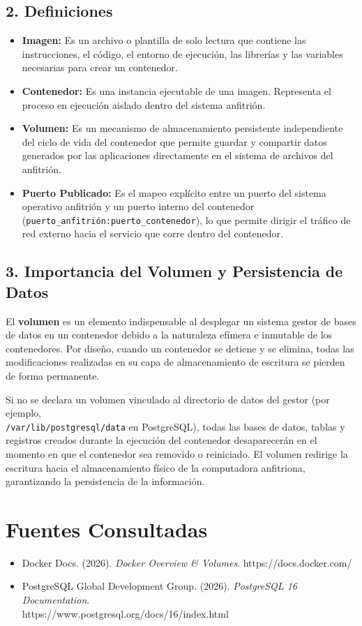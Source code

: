 \documentclass[12pt,letterpaper]{article}
\begin{document}
\subsection*{2. Definiciones}
\begin{itemize}
    \item \textbf{Imagen:} Es un archivo o plantilla de solo lectura que contiene las instrucciones, el código, el entorno de ejecución, las librerías y las variables necesarias para crear un contenedor.
    
    \item \textbf{Contenedor:} Es una instancia ejecutable de una imagen. Representa el proceso en ejecución aislado dentro del sistema anfitrión.
    
    \item \textbf{Volumen:} Es un mecanismo de almacenamiento persistente independiente del ciclo de vida del contenedor que permite guardar y compartir datos generados por las aplicaciones directamente en el sistema de archivos del anfitrión.
    
    \item \textbf{Puerto Publicado:} Es el mapeo explícito entre un puerto del sistema operativo anfitrión y un puerto interno del contenedor (\texttt{puerto\_anfitrión:puerto\_contenedor}), lo que permite dirigir el tráfico de red externo hacia el servicio que corre dentro del contenedor.
\end{itemize}

\subsection*{3. Importancia del Volumen y Persistencia de Datos}
El \textbf{volumen} es un elemento indispensable al desplegar un sistema gestor de bases de datos en un contenedor debido a la naturaleza efímera e inmutable de los contenedores. Por diseño, cuando un contenedor se detiene y se elimina, todas las modificaciones realizadas en su capa de almacenamiento de escritura se pierden de forma permanente. 

Si no se declara un volumen vinculado al directorio de datos del gestor (por ejemplo,\\ \texttt{/var/lib/postgresql/data} en PostgreSQL), todas las bases de datos, tablas y registros creados durante la ejecución del contenedor desaparecerán en el momento en que el contenedor sea removido o reiniciado. El volumen redirige la escritura hacia el almacenamiento físico de la computadora anfitriona, garantizando la persistencia de la información.

\section*{Fuentes Consultadas}
\begin{itemize}
    \item Docker Docs. (2026). \textit{Docker Overview \& Volumes}. https://docs.docker.com/
    \item PostgreSQL Global Development Group. (2026). \textit{PostgreSQL 16 Documentation}.\\ https://www.postgresql.org/docs/16/index.html
\end{itemize}
\end{document}
